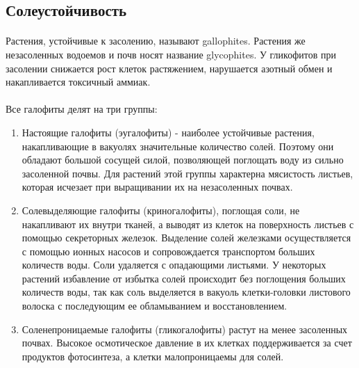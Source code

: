 
\subsection*{Солеустойчивость}

\paragraph*{}Растения, устойчивые к засолению, называют \gls{gallophites}. Растения же незасоленных водоемов и почв носят название \gls{glycophites}. У гликофитов при засолении снижается рост клеток растяжением, нарушается азотный обмен и накапливается токсичный аммиак.

\paragraph*{}Все галофиты делят на три группы:

\begin{enumerate}
	\item Настоящие галофиты (эугалофиты) - наиболее устойчивые растения, накапливающие в вакуолях значительные количество солей. Поэтому они обладают большой сосущей силой, позволяющей поглощать воду из сильно засоленной почвы. Для растений этой группы характерна мясистость листьев, которая исчезает при выращивании их на незасоленных почвах.
	\item Солевыделяющие галофиты (криногалофиты), поглощая соли, не накапливают их внутри тканей, а выводят из клеток на поверхность листьев с помощью секреторных железок. Выделение солей железками осуществляется с помощью ионных насосов и сопровождается транспортом больших количеств воды. Соли удаляется с опадающими листьями. У некоторых растений избавление от избытка солей происходит без поглощения больших количеств воды, так как соль выделяется в вакуоль клетки-головки листового волоска с последующим ее обламыванием и восстановлением.
	\item Соленепроницаемые галофиты (гликогалофиты) растут на менее засоленных почвах. Высокое осмотическое давление в их клетках поддерживается за счет продуктов фотосинтеза, а клетки малопроницаемы для солей. 
\end{enumerate}

